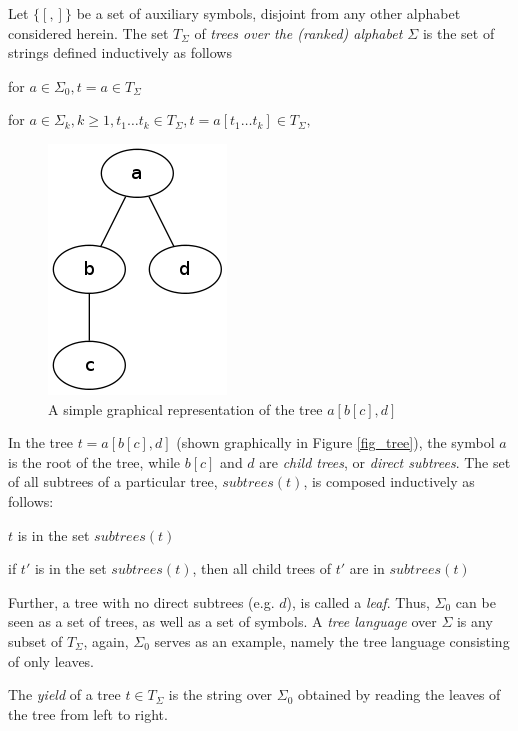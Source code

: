 Let $\{[, ]\}$ be a set of auxiliary symbols, disjoint from any other alphabet considered herein.
The set $T_\Sigma$ of \emph{trees over the (ranked)
alphabet $\Sigma$} is the set of strings defined inductively as follows
\begin{compactitem}
\item for  $a \in \Sigma_0, t = a \in T_\Sigma$
\item for  $a \in \Sigma_k, k \geq 1, t_1 \ldots t_k \in T_\Sigma,  t = a[t_1
\ldots t_k] \in T_\Sigma,$
\end{compactitem}

\begin{figure}[htb]
\center
\includegraphics[scale=0.5]{tree.png}
\caption{A simple graphical representation of the tree $a[b[c],d]$}
\label{fig_tree}
\end{figure}

In the tree $t = a[b[c],d]$ (shown graphically in Figure \vref{fig_tree}), the
symbol $a$ is the root of the tree, while $b[c]$ and $d$ are
\emph{child trees}, or \emph{direct subtrees}. The set of all subtrees of a
particular tree, $subtrees(t)$, is composed inductively as follows:
\begin{compactitem}
\item $t$ is in the set $subtrees(t)$
\item if $t'$ is in the set $subtrees(t)$, then all child trees of $t'$ are
in $subtrees(t)$
\end{compactitem}

Further, a tree with no direct subtrees (e.g. $d$), is called a
\emph{leaf}. Thus, $\Sigma_0$ can be seen as a set of trees, as well as a
set of symbols. A \emph{tree language} over $\Sigma$ is any subset of
$T_\Sigma$, again, $\Sigma_0$ serves as an example, namely the tree
language consisting of only leaves.


The \textit{yield} of a tree $t \in T_\Sigma$ is the string over $\Sigma_0$
obtained by reading the leaves of the tree from left to right. 

